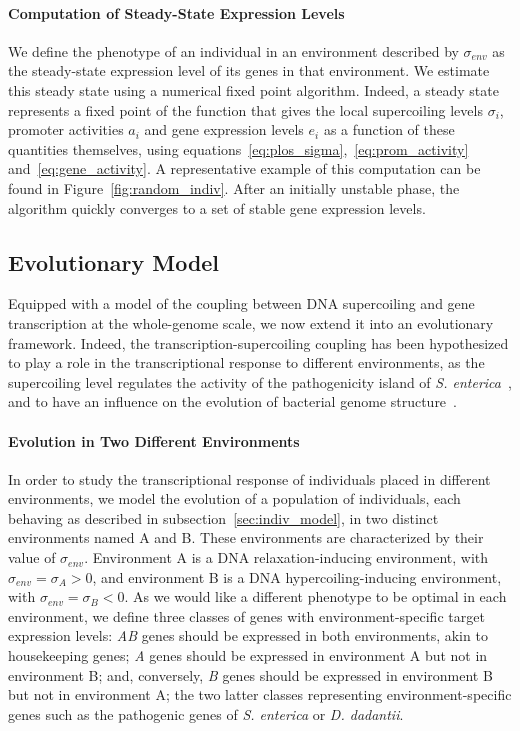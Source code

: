 \paragraph{Computation of Steady-State Expression Levels}

We define the phenotype of an individual in an environment described by $\sigma_{env}$ as the steady-state expression level of its genes in that environment.
We estimate this steady state using a numerical fixed point algorithm.
Indeed, a steady state represents a fixed point of the function that gives the local supercoiling levels $\sigma_i$, promoter activities $a_i$ and gene expression levels $e_i$ as a function of these quantities themselves, using equations~\ref{eq:plos_sigma},~\ref{eq:prom_activity} and~\ref{eq:gene_activity}.
A representative example of this computation can be found in Figure~\ref{fig:random_indiv}.
After an initially unstable phase, the algorithm quickly converges to a set of stable gene expression levels.

\subsection{Evolutionary Model}
\label{sec:evol_model}

Equipped with a model of the coupling between DNA supercoiling and gene transcription at the whole-genome scale, we now extend it into an evolutionary framework.
Indeed, the transcription-supercoiling coupling has been hypothesized to play a role in the transcriptional response to different environments, as the supercoiling level regulates the activity of the pathogenicity island of \emph{S. enterica}~\citep{cameron2012}, and to have an influence on the evolution of bacterial genome structure~\citep{junier2016}.

\paragraph{Evolution in Two Different Environments}
In order to study the transcriptional response of individuals placed in different environments, we model the evolution of a population of individuals, each behaving as described in subsection~\ref{sec:indiv_model}, in two distinct environments named A and B.
These environments are characterized by their value of $\sigma_{env}$.
Environment A is a DNA relaxation-inducing environment, with $\sigma_{env} = \sigma_A > 0$, and environment B is a DNA hypercoiling-inducing environment, with $\sigma_{env} = \sigma_B < 0$.
As we would like a different phenotype to be optimal in each environment, we define three classes of genes with environment-specific target expression levels: \emph{AB} genes should be expressed in both environments, akin to housekeeping genes; \emph{A} genes should be expressed in environment A but not in environment B; and, conversely, \emph{B} genes should be expressed in environment B but not in environment A; the two latter classes representing environment-specific genes such as the pathogenic genes of \emph{S. enterica} or \emph{D. dadantii}.

